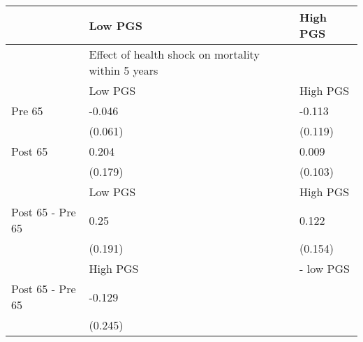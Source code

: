 % 
\begin{tabular}{lll}
  \hline
 & Low PGS & High PGS \\ 
  \hline
 & Effect of health shock on mortality within 5 years &  \\ 
   & Low PGS & High PGS \\ 
  Pre 65 & -0.046 & -0.113 \\ 
   & (0.061) & (0.119) \\ 
  Post 65 & 0.204 & 0.009 \\ 
   & (0.179) & (0.103) \\ 
   & Low PGS & High PGS \\ 
  Post 65 - Pre 65 & 0.25 & 0.122 \\ 
   & (0.191) & (0.154) \\ 
   & High PGS  & - low PGS \\ 
  Post 65 - Pre 65 & -0.129 &  \\ 
   & (0.245) &  \\ 
   \hline
\end{tabular}
